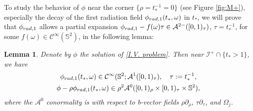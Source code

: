 \documentclass[10pt,a4paper,reqno]{amsart}
\newcommand{\CI}{\mathcal{C}^\infty}
\newcommand{\A}{\mathcal{A}}
\newcommand{\pa}{\partial}
\renewcommand{\S}{{\mathbb S}}
\newcommand{\p}{\phi}
\newtheorem{lemma}[theorem]{Lemma}
\theoremstyle{definition}
\theoremstyle{remark}
\numberwithin{equation}{section}
\newcommand{\ts}{t_*}
\begin{document}
To study the behavior of $\phi$ near the corner $\{\rho=\ts^{-1}=0\}$ (see Figure \ref{fig:M+}), especially the decay of the first radiation field $\phi_{\rm{rad},1}(\ts,\omega)$ in $\ts$, we will prove that $\phi_{{\rm rad},1}$ allows a partial expansion $\phi_{\rm{rad},1} - f(\omega) \tau \in \A^{2-}([0,1)_\tau)$, $\tau = t_*^{-1}$, for some $f(\omega)\in\CI(\S^2)$, in the following lemma: 

\begin{lemma}
	\label{lem:rad field large time}
 Denote by $\p$ the solution of \eqref{I.V. problem}. Then near $\mathscr I^{+}\cap\{\ts>1\}$, we have
	\begin{equation}
		\label{radiation field 1}
		\begin{gathered}
			\phi_{\rm{rad},1}(\ts,\omega)\in \CI(\S^2;\A^1([0,1)_\tau),\quad \tau := \ts^{-1}, \\
			\phi - \rho \phi_{\rm{rad},1}(\ts,\omega) \in \rho^2 \A^0 ([0,1)_\rho \times [0,1)_\tau \times \mathbb{S}^2),
		\end{gathered}
	\end{equation}
where the $\A^0$ conormality is with respect to b-vector fields $\rho\pa_\rho$, $\tau\pa_\tau$, and $\Omega_j$. 
\end{lemma}
\end{document}
